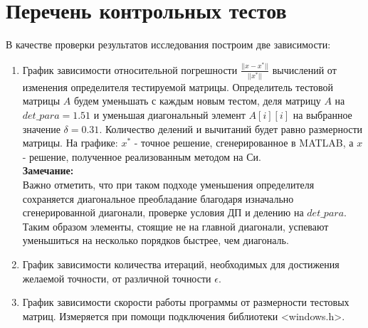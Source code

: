 \documentclass[12pt]{article}
\begin{document}
\section{Перечень контрольных тестов}
В качестве проверки результатов исследования построим две зависимости:
\begin{enumerate}
    \item График зависимости относительной погрешности $\frac{|| x - x^{*} ||}{|| x^{*} ||}$ вычислений от изменения определителя тестируемой матрицы. Определитель тестовой матрицы $A$ будем уменьшать с каждым новым тестом, деля матрицу $A$ на $det\_para = 1.51$ и уменьшая диагональный элемент $A[i][i]$ на выбранное значение $\delta = 0.31$. Количество делений и вычитаний будет равно размерности матрицы. На графике: $x^{*}$ - точное решение, сгенерированное в MATLAB, а $x$ - решение, полученное реализованным методом на Си.\\
    \textbf{Замечание:}\\
    Важно отметить, что при таком подходе уменьшения определителя сохраняется диагональное преобладание благодаря изначально сгенерированной диагонали, проверке условия ДП и делению на $det\_para$. Таким образом элементы, стоящие не на главной диагонали, успевают уменьшиться на несколько порядков быстрее, чем диагональ.
    \item График зависимости количества итераций, необходимых для достижения желаемой точности, от различной точности $\epsilon$.
    \item График зависимости скорости работы программы от размерности тестовых матриц. Измеряется при помощи подключения библиотеки <windows.h>.
\end{enumerate}
\end{document}
